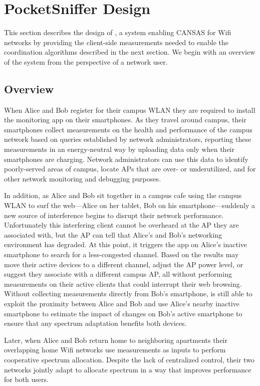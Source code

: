 \section{PocketSniffer Design}
\label{sec-design}

This section describes the design of \PS{}, a system enabling CANSAS for Wifi
networks by providing the client-side measurements needed to enable the
coordination algorithms described in the next section. We begin with an
overview of the \PS{} system from the perspective of a network user.

\subsection{Overview}

When Alice and Bob register for their campus WLAN they are required to
install the \PS{} monitoring app on their smartphones. As they travel around
campus, their smartphones collect measurements on the health and performance
of the campus network based on queries established by network administrators,
reporting these measurements in an energy-neutral way by uploading data only
when their smartphones are charging. Network administrators can use this data
to identify poorly-served areas of campus, locate APs that are over- or
underutilized, and for other network monitoring and debugging purposes.

In addition, as Alice and Bob sit together in a campus cafe using the campus
WLAN to surf the web---Alice on her tablet, Bob on his smartphone---suddenly
a new source of interference begins to disrupt their network performance.
Unfortunately this interfering client cannot be overheard at the AP they
are associated with, but the AP can tell that Alice's and Bob's networking
environment has degraded. At this point, it triggers the \PS{} app on Alice's
inactive smartphone to search for a less-congested channel. Based on the
results \PS{} may move their active devices to a different channel, adjust
the AP power level, or suggest they associate with a different campus AP, all
without performing measurements on their active clients that could interrupt
their web browsing. Without collecting measurements directly from Bob's
smartphone, \PS{} is still able to exploit the proximity between Alice and
Bob and use Alice's nearby inactive smartphone to estimate the impact of
changes on Bob's active smartphone to ensure that any spectrum adaptation
benefits both devices.

Later, when Alice and Bob return home to neighboring apartments their
overlapping home Wifi networks use \PS{} measurements as inputs to perform
cooperative spectrum allocation. Despite the lack of centralized control,
their two networks jointly adapt to allocate spectrum in a way that improves
performance for both users.

